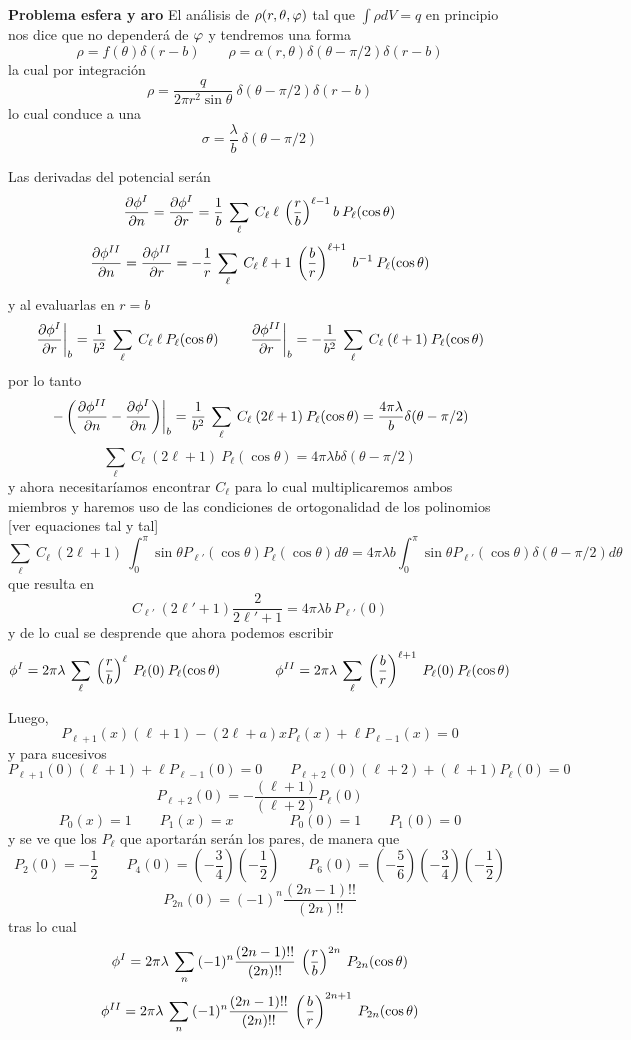 \documentclass[10pt,oneside]{CBFT_book}
\begin{document}
\begin{ejemplo}{\bf Problema esfera y aro}
El análisis de $\rho(r,\theta,\varphi)$ tal que $\int \rho dV = q$ en principio nos dice que no 
dependerá de $\varphi$ y tendremos una forma
\[
	\rho = f(\theta) \delta(r-b) \qquad \rho = \alpha(r,\theta) \delta(\theta-\pi/2) \delta(r-b)
\]
la cual por integración
\[
	\rho = \frac{q}{2 \pi r^2 \sin \theta } \: \delta(\theta-\pi/2) \delta(r-b)
\]
lo cual conduce a una 
\[
	\sigma = \frac{\lambda}{b} \: \delta(\theta-\pi/2)
\]

Las derivadas del potencial serán
\[
	\frac{\partial^{\hspace{-0.05em}} {\phi^{I}}}{\partial {n}^{\hspace{-0.05em}}} = \frac{\partial^{\hspace{-0.05em}} {\phi^{I}}}{\partial {r}^{\hspace{-0.05em}}} = 
	\frac{1}{b} \: \sum_\ell \: C_\ell \: \ell \: \left( \frac{ r }{ b } \right)^{\ell-1} b \: P_\ell(\cos\theta) 
\]
\[
	\frac{\partial^{\hspace{-0.05em}} {\phi^{II}}}{\partial {n}^{\hspace{-0.05em}}} = \frac{\partial^{\hspace{-0.05em}} {\phi^{II}}}{\partial {r}^{\hspace{-0.05em}}} =
	- \frac{1}{r} \: \sum_\ell \: C_\ell \: {\ell+1} \: \left( \frac{ b }{ r } \right)^{\ell+1} \: b^{-1} \: P_\ell(\cos\theta)
\]
y al evaluarlas en $r=b$
\[
	\left.\frac{\partial^{\hspace{-0.05em}} {\phi^{I}}}{\partial {r}^{\hspace{-0.05em}}} \right|_b = 
	\frac{1}{b^2} \: \sum_\ell \: C_\ell \: \ell \: P_\ell(\cos\theta) 
	\qquad 
	\left.\frac{\partial^{\hspace{-0.05em}} {\phi^{II}}}{\partial {r}^{\hspace{-0.05em}}} \right|_b =
	- \frac{1}{b^2} \: \sum_\ell \: C_\ell \: (\ell+1) \: P_\ell(\cos\theta)
\]
por lo tanto
\[
	 \left. -\left( \frac{\partial^{\hspace{-0.05em}} {\phi^{II}}}{\partial {n}^{\hspace{-0.05em}}} - \frac{\partial^{\hspace{-0.05em}} {\phi^{I}}}{\partial {n}^{\hspace{-0.05em}}} \right) \right|_b =
	 \frac{1}{b^2} \: \sum_\ell \: C_\ell \: (2\ell+1) \: P_\ell(\cos\theta) = 
	 \frac{4\pi \lambda}{b} \delta(\theta-\pi/2)
\]
\[
	\sum_\ell \: C_\ell \: (2\ell+1) \: P_\ell(\cos\theta) = 
	4\pi \lambda b \delta(\theta-\pi/2)
\]
y ahora necesitaríamos encontrar $C_\ell$ para lo cual multiplicaremos ambos miembros
y haremos uso de las condiciones de ortogonalidad de los polinomios [ver equaciones
tal y tal]
\[
	\sum_\ell \: C_\ell \: (2\ell+1) \: \int_0^\pi \sin\theta P_{\ell'}(\cos\theta) P_\ell(\cos\theta) d\theta = 
	4\pi \lambda b \int_0^\pi \sin\theta P_{\ell'}(\cos\theta) \delta(\theta-\pi/2) d\theta
\]
que resulta en
\[
	C_{\ell'} \: (2\ell'+1) \frac{2}{2\ell'+1} = 
	4\pi \lambda b \: P_{\ell'}(0)
\]
y de lo cual se desprende que ahora podemos escribir
\[
	\phi^{I} = 2\pi\lambda \: \sum_\ell \: \left( \frac{ r }{ b } \right)^{\ell} \: P_{\ell}(0) \: P_\ell(\cos\theta) 
	\qquad \qquad 
	\phi^{II} = 2\pi\lambda \: \sum_\ell \: \left( \frac{ b }{ r } \right)^{\ell+1} \: P_{\ell}(0) \: P_\ell(\cos\theta)
\]

Luego,
\[
	P_{\ell+1}(x) (\ell+1) - (2\ell+a) x P_{\ell}(x) + \ell P_{\ell-1}(x) = 0
\]
y para sucesivos
\[
	P_{\ell+1}(0) (\ell+1) + \ell P_{\ell-1}(0) = 0 \qquad 
	P_{\ell+2}(0) (\ell+2) + (\ell+1) P_{\ell}(0) = 0
\]
\[
	P_{\ell+2}(0) = -\frac{(\ell+1)}{(\ell+2)} P_{\ell}(0)
\]
\[
	P_0(x) = 1 \qquad P_1(x) = x \qquad \qquad 
	P_0(0) = 1 \qquad P_1(0) = 0
\]
y se ve que los $P_\ell$ que aportarán serán los pares, de manera que
\[
	P_{2}(0) = -\frac{1}{2} \qquad 
	P_{4}(0) = \left( -\frac{3}{4}  \right) \left( -\frac{1}{2}  \right)\qquad 
	P_{6}(0) = \left( -\frac{5}{6}  \right)\left( -\frac{3}{4}  \right) \left( -\frac{1}{2}  \right)
\]
\[
	P_{2n}(0) = (-1)^n \frac{(2n-1)!!}{(2n)!!}
\]
tras lo cual
\[
	\phi^{I} = 2\pi\lambda \: \sum_n \: (-1)^n \frac{(2n-1)!!}{(2n)!!} 
	\: \left( \frac{ r }{ b } \right)^{2n} \: P_{2n}(\cos\theta) 
\]
\[
	\phi^{II} = 2\pi\lambda \: \sum_n \: (-1)^n \frac{(2n-1)!!}{(2n)!!} 
	\: \left( \frac{ b }{ r } \right)^{2n+1} \: P_{2n}(\cos\theta)
\]


\end{ejemplo}
\end{document}
